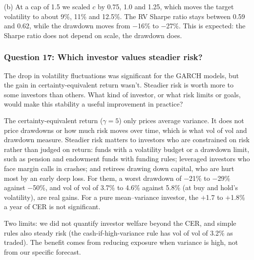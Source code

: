 (b) At a cap of 1.5 we scaled $c$ by 0.75, 1.0 and 1.25, which moves the target volatility to about 9\%, 11\% and 12.5\%. The RV Sharpe ratio stays between 0.59 and 0.62, while the drawdown moves from $-$16\% to $-$27\%. This is expected: the Sharpe ratio does not depend on scale, the drawdown does.

\subsubsection*{Question 17: Which investor values steadier risk?}
\begin{question}
The drop in volatility fluctuations was significant for the GARCH models, but the gain in certainty-equivalent return wasn't. Steadier risk is worth more to some investors than others. What kind of investor, or what risk limits or goals, would make this stability a useful improvement in practice?
\end{question}
The certainty-equivalent return ($\gamma=5$) only prices average variance. It does not price drawdowns or how much risk moves over time, which is what vol of vol and drawdown measure. Steadier risk matters to investors who are constrained on risk rather than judged on return: funds with a volatility budget or a drawdown limit, such as pension and endowment funds with funding rules; leveraged investors who face margin calls in crashes; and retirees drawing down capital, who are hurt most by an early deep loss. For them, a worst drawdown of $-$21\% to $-$29\% against $-$50\%, and vol of vol of 3.7\% to 4.6\% against 5.8\% (at buy and hold's volatility), are real gains. For a pure mean--variance investor, the $+$1.7 to $+$1.8\% a year of CER is not significant.

Two limits: we did not quantify investor welfare beyond the CER, and simple rules also steady risk (the cash-if-high-variance rule has vol of vol of 3.2\% as traded). The benefit comes from reducing exposure when variance is high, not from our specific forecast.


